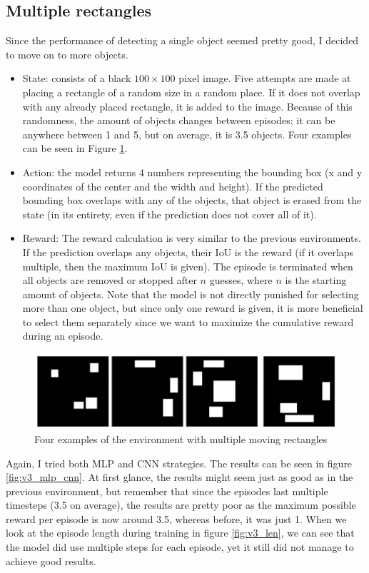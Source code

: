 \documentclass[
  digital,     %
  oneside,     %
  nosansbold,  %
  nocolorbold, %
  lof,         %
  lot,         %
]{fithesis4}
\begin{document}
\subsection{Multiple rectangles}
\label{subsec:multi-rect}
Since the performance of detecting a single object seemed pretty good, I decided to move on to more objects.
\begin{itemize}
    \item State: consists of a black $100\times100$ pixel image. Five attempts are made at placing a rectangle of a random size in a random place. If it does not overlap with any already placed rectangle, it is added to the image. Because of this randomness, the amount of objects changes between episodes; it can be anywhere between 1 and 5, but on average, it is 3.5 objects. Four examples can be seen in Figure \ref{fig:env3}.
    \item Action: the model returns 4 numbers representing the bounding box (x and y coordinates of the center and the width and height). If the predicted bounding box overlaps with any of the objects, that object is erased from the state (in its entirety, even if the prediction does not cover all of it).
    \item Reward: The reward calculation is very similar to the previous environments. If the prediction overlaps any objects, their IoU is the reward (if it overlaps multiple, then the maximum IoU is given). The episode is terminated when all objects are removed or stopped after $n$ guesses, where $n$ is the starting amount of objects. Note that the model is not directly punished for selecting more than one object, but since only one reward is given, it is more beneficial to select them separately since we want to maximize the cumulative reward during an episode.
\end{itemize}

\begin{figure}
    \includegraphics[width=1\linewidth]{env_examples/env3.png}
    \caption{Four examples of the environment with multiple moving rectangles}
    \label{fig:env3}
\end{figure}

Again, I tried both MLP and CNN strategies. The results can be seen in figure \ref{fig:v3_mlp_cnn}. At first glance, the results might seem just as good as in the previous environment, but remember that since the episodes last multiple timesteps (3.5 on average), the results are pretty poor as the maximum possible reward per episode is now around 3.5, whereas before, it was just 1. When we look at the episode length during training in figure \ref{fig:v3_len}, we can see that the model did use multiple steps for each episode, yet it still did not manage to achieve good results.
\end{document}
